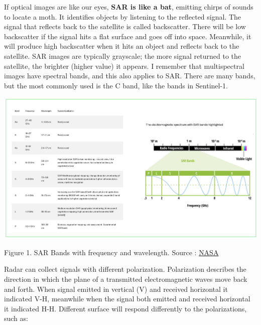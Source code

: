 \documentclass[
  letterpaper,
  DIV=11,
  numbers=noendperiod]{scrreprt}
\begin{document}
If optical images are like our eyes, \textbf{SAR is like a bat},
emitting chirps of sounds to locate a moth. It identifies objects by
listening to the reflected signal. The signal that reflects back to the
satellite is called backscatter. There will be low backscatter if the
signal hits a flat surface and goes off into space. Meanwhile, it will
produce high backscatter when it hits an object and reflects back to the
satellite. SAR images are typically grayscale; the more signal returned
to the satellite, the brighter (higher value) it appears. I remember
that multispectral images have spectral bands, and this also applies to
SAR. There are many bands, but the most commonly used is the C band,
like the bands in Sentinel-1.

\includegraphics[width=7.25in,height=\textheight]{images/clipboard-648766891.png}

Figure 1. SAR Bands with frequency and wavelength. Source :
\href{https://www.earthdata.nasa.gov/learn/earth-observation-data-basics/sar}{NASA}

Radar can collect signals with different polarization. Polarization
describes the direction in which the plane of a transmitted
electromagnetic waves move back and forth. When signal emitted in
vertical (V) and received horizontal it indicated V-H, meanwhile when
the signal both emitted and received horizontal it indicated H-H.
Different surface will respond differently to the polarizations, such
as:
\end{document}
